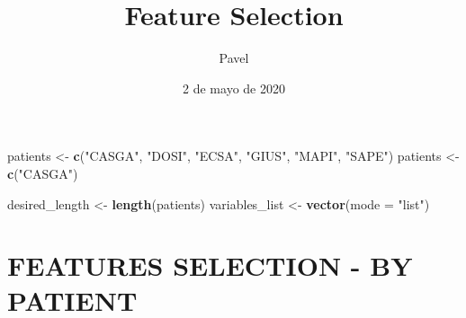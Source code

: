 \documentclass[
]{article}
\title{Feature Selection}
\author{Pavel}
\date{2 de mayo de 2020}
\newenvironment{Shaded}{\begin{snugshade}}{\end{snugshade}}
\newcommand{\DataTypeTok}[1]{\textcolor[rgb]{0.13,0.29,0.53}{#1}}
\newcommand{\KeywordTok}[1]{\textcolor[rgb]{0.13,0.29,0.53}{\textbf{#1}}}
\newcommand{\NormalTok}[1]{#1}
\newcommand{\StringTok}[1]{\textcolor[rgb]{0.31,0.60,0.02}{#1}}
\begin{document}
\maketitle

\begin{Shaded}
\begin{Highlighting}[]
\NormalTok{patients \textless{}{-}}\StringTok{ }\KeywordTok{c}\NormalTok{(}\StringTok{"CASGA"}\NormalTok{, }\StringTok{"DOSI"}\NormalTok{, }\StringTok{"ECSA"}\NormalTok{, }\StringTok{"GIUS"}\NormalTok{, }\StringTok{"MAPI"}\NormalTok{, }\StringTok{"SAPE"}\NormalTok{)}
\NormalTok{patients \textless{}{-}}\StringTok{ }\KeywordTok{c}\NormalTok{(}\StringTok{"CASGA"}\NormalTok{)}

\NormalTok{desired\_length \textless{}{-}}\StringTok{ }\KeywordTok{length}\NormalTok{(patients)}
\NormalTok{variables\_list \textless{}{-}}\StringTok{ }\KeywordTok{vector}\NormalTok{(}\DataTypeTok{mode =} \StringTok{"list"}\NormalTok{)}
\end{Highlighting}
\end{Shaded}

\hypertarget{features-selection---by-patient}{%
\section{FEATURES SELECTION - BY
PATIENT}\label{features-selection---by-patient}}
\end{document}
